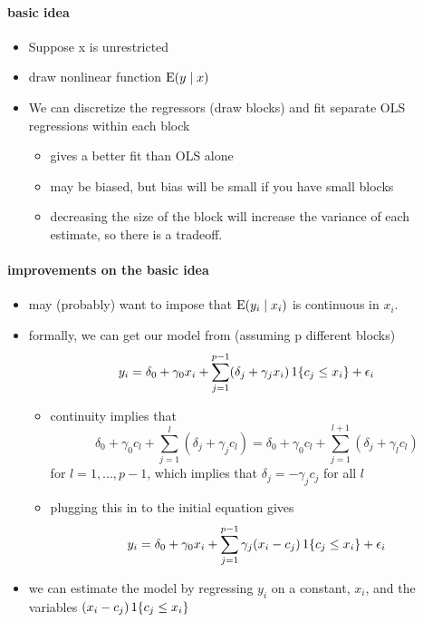 \paragraph{basic idea}
\begin{itemize}
\item Suppose x is unrestricted
\item draw nonlinear function $\operatorname{E}(y \mid x)$
\item We can discretize the regressors (draw blocks) and fit
         separate OLS regressions within each block
\begin{itemize}
\item gives a better fit than OLS alone
\item may be biased, but bias will be small if you have small
           blocks
\item decreasing the size of the block will increase the variance
           of each estimate, so there is a tradeoff.
\end{itemize}
\end{itemize}

\paragraph{improvements on the basic idea}
\begin{itemize}
\item may (probably) want to impose that $\operatorname{E}(y_i \mid x_i)$ is
         continuous in $x_i$.
\item formally, we can get our model from (assuming p different blocks)
  \[
  y_i = \delta_0 + \gamma_0x_i + \sum_{j=1}^{p-1} (\delta_j + \gamma_jx_i) \operatorname{1}\{c_j \leq x_i\} + \epsilon_i
  \]
\begin{itemize}
\item continuity implies that
  \[ \delta_0 + \gamma_0 c_l + \sum_{j=1}^l (\delta_j + \gamma_j c_l) = \delta_0 + \gamma_0 c_l +
  \sum_{j=1}^{l+1} (\delta_j + \gamma_l c_l)\] for $l = 1,...,p-1$, which implies
  that $\delta_j = - \gamma_j c_j$ for all $l$
\item plugging this in to the initial equation gives
  \[
  y_i = \delta_0 + \gamma_0x_i + \sum_{j=1}^{p-1} \gamma_j(x_i-c_j) \operatorname{1}\{c_j \leq x_i\} + \epsilon_i
  \]
\end{itemize}
\item we can estimate the model by regressing $y_i$ on a constant,
  $x_i$, and the variables $(x_i - c_j) \operatorname{1}\{c_j \leq x_i\}$
\end{itemize}

